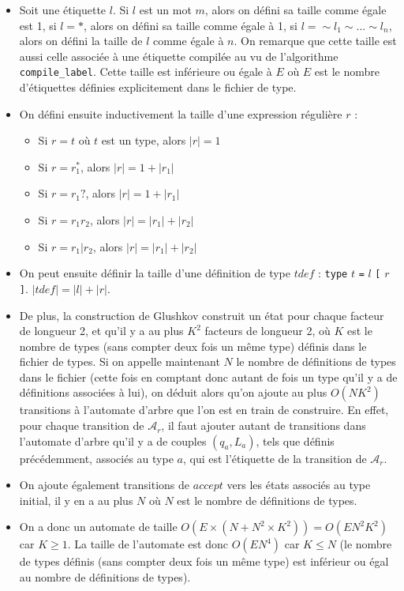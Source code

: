 \documentclass[a4paper, 11pt]{article}
\begin{document}
\begin{itemize}
\item Soit une étiquette $l$. Si $l$ est un mot $m$, alors on défini sa taille
  comme égale est 1, si $l = *$, alors on défini sa taille comme égale à 1, si
  $l = \sim l_1 \sim ... \sim l_n$, alors on défini la taille de $l$ comme égale
  à $n$. On remarque que cette taille est aussi celle associée à une étiquette
  compilée au vu de l'algorithme \texttt{compile\_label}. Cette taille est
  inférieure ou égale à $E$ où $E$ est le nombre d'étiquettes définies
  explicitement dans le fichier de type.
\item On défini ensuite inductivement la taille d'une expression régulière $r$ :
  \begin{itemize}
  \item Si $r = t$ où $t$ est un type, alors $|r| = 1$
  \item Si $r = r_1^*$, alors $|r| = 1 + |r_1|$
  \item Si $r = r_1?$, alors $|r| = 1 + |r_1|$
  \item Si $r = r_1r_2$, alors $|r| = |r_1| + |r_2|$
  \item Si $r = r_1 | r_2$, alors $|r| = |r_1| + |r_2|$
  \end{itemize}
\item On peut ensuite définir la taille d'une définition de type $tdef$ :
  \texttt{type} $t$ \texttt{=} $l$ \texttt{[} $r$ \texttt{]}.
  $|tdef| = |l| + |r|$.
\item De plus, la construction de Glushkov construit un état pour chaque facteur
  de longueur 2, et qu'il y a au plus $K^2$ facteurs de longueur 2, où $K$ est
  le nombre de types (sans compter deux fois un même type) définis dans le
  fichier de types. Si on appelle maintenant $N$ le nombre de définitions de
  types dans le fichier (cette fois en comptant donc autant de fois un type
  qu'il y a de définitions associées à lui), on déduit alors qu'on ajoute au
  plus $O(NK^2)$ transitions à l'automate d'arbre que l'on est en train de
  construire. En effet, pour chaque transition de $\mathcal{A}_r$, il faut
  ajouter autant de transitions dans l'automate d'arbre qu'il y a de couples
  $(q_a, L_a)$, tels que définis précédemment, associés au type $a$, qui est
  l'étiquette de la transition de $\mathcal{A}_r$.
\item On ajoute également transitions de $accept$ vers les états associés au
  type initial, il y en a au plus $N$ où $N$ est le nombre de définitions de
  types.
\item On a donc un automate de taille
  $O(E \times (N + N^2 \times K^2)) = O(EN^2K^2)$ car $K \geq 1$. La taille de
  l'automate est donc $O(EN^4)$ car $K \leq N$ (le nombre de types définis (sans
  compter deux fois un même type) est inférieur ou égal au nombre de définitions
  de types).
\end{itemize}
\end{document}
